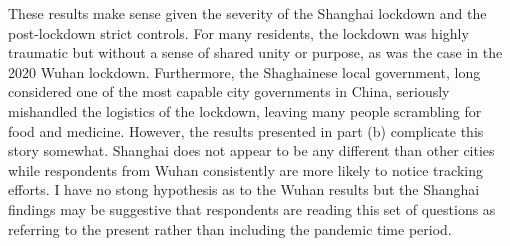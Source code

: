 \documentclass[
  letterpaper,
  DIV=11,
  numbers=noendperiod]{scrartcl}
\begin{document}
These results make sense given the severity of the Shanghai lockdown and
the post-lockdown strict controls. For many residents, the lockdown was
highly traumatic but without a sense of shared unity or purpose, as was
the case in the 2020 Wuhan lockdown. Furthermore, the Shaghainese local
government, long considered one of the most capable city governments in
China, seriously mishandled the logistics of the lockdown, leaving many
people scrambling for food and medicine. However, the results presented
in part (b) complicate this story somewhat. Shanghai does not appear to
be any different than other cities while respondents from Wuhan
consistently are more likely to notice tracking efforts. I have no stong
hypothesis as to the Wuhan results but the Shanghai findings may be
suggestive that respondents are reading this set of questions as
referring to the present rather than including the pandemic time period.
\end{document}
